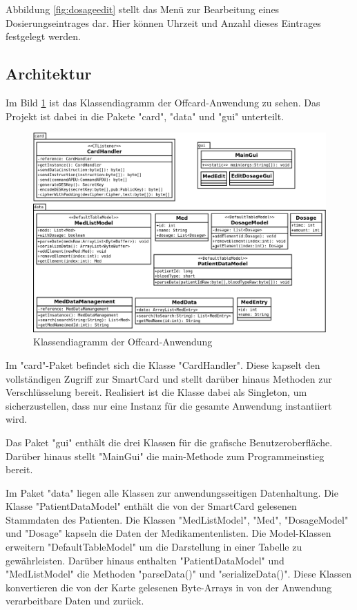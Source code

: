 \documentclass[parskip]{scrartcl}
\begin{document}
		Abbildung \ref{fig:dosageedit} stellt das Menü zur Bearbeitung eines Dosierungseintrages dar. Hier können Uhrzeit und Anzahl dieses Eintrages festgelegt werden.
		
		\subsection{Architektur}
		Im Bild \ref{fig:classdiagramm} ist das Klassendiagramm der Offcard-Anwendung zu sehen. Das Projekt ist dabei in die Pakete "card", "data" und "gui" unterteilt.
		
		\begin{figure}[H]
			\centering
			\includegraphics[width=\linewidth]{./klassendiagramm.png}
			\caption{Klassendiagramm der Offcard-Anwendung}
			\label{fig:classdiagramm}
		\end{figure}
		
		Im "card"-Paket befindet sich die Klasse "CardHandler". Diese kapselt den vollständigen Zugriff zur SmartCard und stellt darüber hinaus Methoden zur Verschlüsselung bereit. Realisiert ist die Klasse dabei als Singleton, um sicherzustellen, dass nur eine Instanz für die gesamte Anwendung instantiiert wird.
		
		Das Paket "gui" enthält die drei Klassen für die grafische Benutzeroberfläche. Darüber hinaus stellt "MainGui" die main-Methode zum Programmeinstieg bereit.
		
		Im Paket "data" liegen alle Klassen zur anwendungsseitigen Datenhaltung. Die Klasse "PatientDataModel" enthält die von der SmartCard gelesenen Stammdaten des Patienten. Die Klassen "MedListModel", "Med", "DosageModel" und "Dosage" kapseln die Daten der Medikamentenlisten. Die Model-Klassen erweitern "DefaultTableModel" um die Darstellung in einer Tabelle zu gewährleisten. Darüber hinaus enthalten "PatientDataModel" und "MedListModel" die Methoden "parseData()" und "serializeData()". Diese Klassen konvertieren die von der Karte gelesenen Byte-Arrays in von der Anwendung verarbeitbare Daten und zurück. 
		
\end{document}
